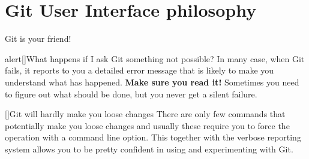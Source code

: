 \documentclass[usenames,svgnames,14pt]{beamer}
\begin{document}
\section*{Git User Interface philosophy}
\PrepareURLsymbol[PB]
\begin{frame}{Git is your friend!}
    \begin{varblock}{alert}[\textwidth]{What happens if I ask Git something not possible?}
        In many case, when Git fails, it reports to you a detailed error message that is likely to make you understand what has happened.
        \textbf{Make sure you read it!}
        Sometimes you need to figure out what should be done, but you never get a silent failure.
    \end{varblock}
    \begin{varblock}{}[\textwidth]{Git will hardly make you loose changes}
        \small
        There are only few commands that potentially make you loose changes and usually these require you to force the operation with a command line option.
        This together with the verbose reporting system allows you to be pretty confident in using and experimenting with Git.
    \end{varblock}
\end{frame}



\end{document}
